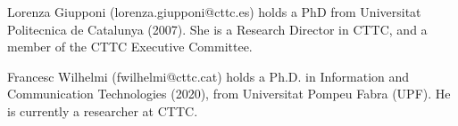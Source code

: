 \documentclass[journal]{IEEEtran}
\begin{document}
	
	
	
	\vspace{-.7cm}
	\begin{IEEEbiographynophoto}{Lorenza Giupponi}
		(lorenza.giupponi@cttc.es) holds  a  PhD  from  Universitat  Politecnica  de  Catalunya
		(2007). She is a Research Director in CTTC, and a member of the CTTC Executive Committee.
	\end{IEEEbiographynophoto}
	\vspace{-.5cm}
	\begin{IEEEbiographynophoto}{Francesc Wilhelmi}
		(fwilhelmi@cttc.cat) holds a Ph.D. in Information and Communication Technologies (2020), from Universitat Pompeu Fabra (UPF). He is currently a researcher at CTTC. 
	\end{IEEEbiographynophoto}
	
\end{document}
